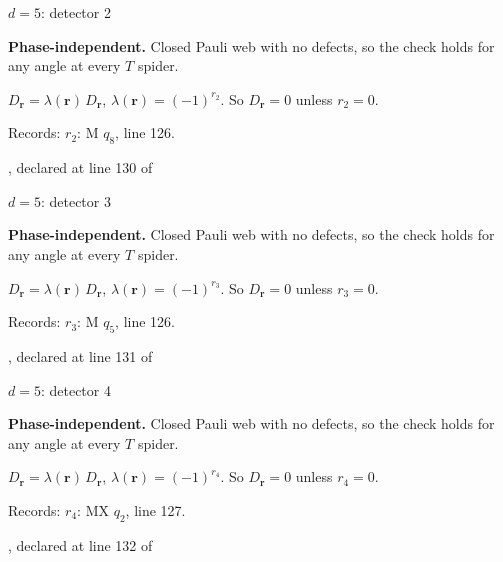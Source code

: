 \label{d5_det002}
{\Large $d=5$: detector 2}\par
\textbf{Phase-independent.} Closed Pauli web with no defects, so the check holds for any angle at every $T$ spider.
\begin{center}
\end{center}
\vspace{-1mm}
$D_{\boldsymbol r}=\lambda(\boldsymbol r)\,D_{\boldsymbol r}$, \quad $\lambda(\boldsymbol r)=(-1)^{r_{2}}$. \qquad So $D_{\boldsymbol r}=0$ unless $r_{2}=0$.
\par\smallskip\begin{minipage}{.98\linewidth}\small Records: $r_{2}$: M $q_{8}$, line 126.\end{minipage}
\vfill
{\footnotesize\texttt{}, declared at line 130 of \texttt{}}
\newpage

\label{d5_det003}
{\Large $d=5$: detector 3}\par
\textbf{Phase-independent.} Closed Pauli web with no defects, so the check holds for any angle at every $T$ spider.
\begin{center}
\end{center}
\vspace{-1mm}
$D_{\boldsymbol r}=\lambda(\boldsymbol r)\,D_{\boldsymbol r}$, \quad $\lambda(\boldsymbol r)=(-1)^{r_{3}}$. \qquad So $D_{\boldsymbol r}=0$ unless $r_{3}=0$.
\par\smallskip\begin{minipage}{.98\linewidth}\small Records: $r_{3}$: M $q_{5}$, line 126.\end{minipage}
\vfill
{\footnotesize\texttt{}, declared at line 131 of \texttt{}}
\newpage

\label{d5_det004}
{\Large $d=5$: detector 4}\par
\textbf{Phase-independent.} Closed Pauli web with no defects, so the check holds for any angle at every $T$ spider.
\begin{center}
\end{center}
\vspace{-1mm}
$D_{\boldsymbol r}=\lambda(\boldsymbol r)\,D_{\boldsymbol r}$, \quad $\lambda(\boldsymbol r)=(-1)^{r_{4}}$. \qquad So $D_{\boldsymbol r}=0$ unless $r_{4}=0$.
\par\smallskip\begin{minipage}{.98\linewidth}\small Records: $r_{4}$: MX $q_{2}$, line 127.\end{minipage}
\vfill
{\footnotesize\texttt{}, declared at line 132 of \texttt{}}
\newpage

